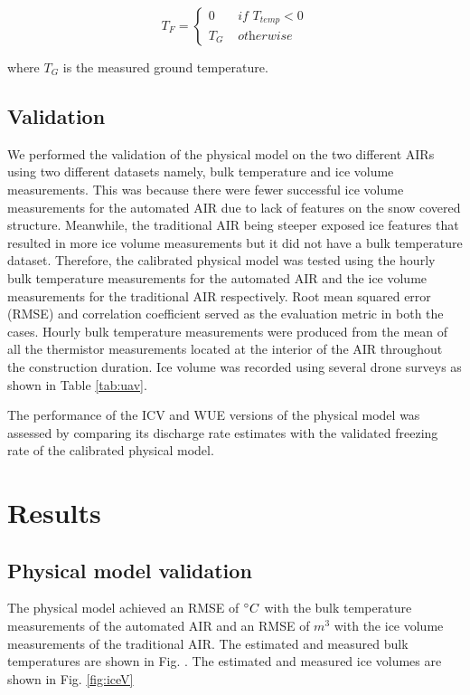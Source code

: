 \documentclass[tc, manuscript]{copernicus}
\begin{document}
\begin{equation}
	T_{F} = \left\{ \begin{array}{ll}
		0 & \textit{ if } T_{temp} < 0 \\
		T_{G} & \textit{ otherwise}
	\end{array} \right.
\end{equation}

where $T_{G}$ is the measured ground temperature.

\subsection{Validation}
We performed the validation of the physical model on the two different AIRs using two different datasets namely,
bulk temperature and ice volume measurements. This was because there were fewer successful ice volume
measurements for the automated AIR due to lack of features on the snow covered structure. Meanwhile, the traditional
AIR being steeper exposed ice features that resulted in more ice volume measurements but it did not have a bulk
temperature dataset. Therefore, the calibrated physical model was tested using the hourly bulk temperature
measurements for the automated AIR and the ice volume measurements for the traditional AIR respectively. Root
mean squared error (RMSE) and correlation coefficient served as the evaluation metric in both the cases. Hourly
bulk temperature measurements were produced from the mean of all the thermistor measurements located at the
interior of the AIR throughout the construction duration. Ice volume was recorded using several drone surveys as
shown in Table \ref{tab:uav}.

The performance of the ICV and WUE versions of the physical model was assessed by comparing its discharge rate
estimates with the validated freezing rate of the calibrated physical model.

\section{Results}

\subsection{Physical model validation}
The physical model achieved an RMSE of $^{\circ} C$ with the bulk temperature measurements of the automated AIR
and an RMSE of $m^3$ with the ice volume measurements of the traditional AIR. The estimated and measured bulk
temperatures are shown in Fig. . The estimated and measured ice volumes are shown in Fig. \ref{fig:iceV}
 
\end{document}
